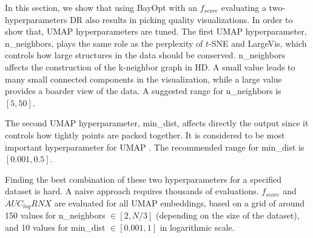 In this section, we show that using BayOpt with an $f_{score}$ evaluating a two-hyperparameters DR also results in picking quality visualizations. In order to show that, UMAP hyperparameters are tuned. The first UMAP hyperparameter, {n\_neighbors}, plays the same role as the perplexity of $t$-SNE and LargeVis, which controls how large structures in the data should be conserved.
{n\_neighbors} affects the construction of the k-neighbor graph in HD.
A small value leads to many small connected components in the visualization, while a large value provides a boarder view of the data.
A suggested range for {n\_neighbors} is $[5, 50]$.

The second UMAP hyperparameter, {min\_dist}, affects directly the output since it controls how tightly points are packed together. It is considered to be most important hyperparameter for UMAP \cite{mcinnes2018umap}.
The recommended range for {min\_dist} is $[0.001, 0.5]$.

Finding the best combination of these two hyperparameters for a specified dataset is hard.
A naive approach requires thousands of evaluations.
$f_{score}$ and $AUC_{log}RNX$ are evaluated for all UMAP embeddings, based on a grid of around 150 values for {n\_neighbors} $\in [2, N/3]$ (depending on the size of the dataset), and 10 values for {min\_dist} $\in [0.001, 1]$ in logarithmic scale.

